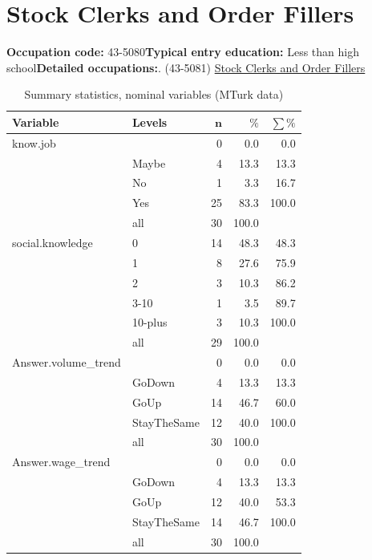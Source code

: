 \documentclass[a4paper,10pt]{article}\usepackage[]{graphicx}\usepackage[]{color}
\begin{document}
\newpage\section{Stock Clerks and Order Fillers}\textbf{Occupation code:} 43-5080\newline\textbf{Typical entry education:} Less than high school\newline\textbf{Detailed occupations:}. (43-5081)  \href{http://www.bls.gov/oes/current/oes435081.htm}{Stock Clerks and Order Fillers}\newline%
\begin{table}[ht]
\centering
{\footnotesize
\begin{tabular}{ll|rrr}
 \textbf{Variable} & \textbf{Levels} & $\mathbf{n}$ & $\mathbf{\%}$ & $\mathbf{\sum \%}$ \\ 
  \hline
know.job &  & 0 & 0.0 & 0.0 \\ 
   & Maybe & 4 & 13.3 & 13.3 \\ 
   & No & 1 & 3.3 & 16.7 \\ 
   & Yes & 25 & 83.3 & 100.0 \\ 
   \hline
 & all & 30 & 100.0 &  \\ 
   \hline
\hline
social.knowledge & 0 & 14 & 48.3 & 48.3 \\ 
   & 1 & 8 & 27.6 & 75.9 \\ 
   & 2 & 3 & 10.3 & 86.2 \\ 
   & 3-10 & 1 & 3.5 & 89.7 \\ 
   & 10-plus & 3 & 10.3 & 100.0 \\ 
   \hline
 & all & 29 & 100.0 &  \\ 
   \hline
\hline
Answer.volume\_trend &  & 0 & 0.0 & 0.0 \\ 
   & GoDown & 4 & 13.3 & 13.3 \\ 
   & GoUp & 14 & 46.7 & 60.0 \\ 
   & StayTheSame & 12 & 40.0 & 100.0 \\ 
   \hline
 & all & 30 & 100.0 &  \\ 
   \hline
\hline
Answer.wage\_trend &  & 0 & 0.0 & 0.0 \\ 
   & GoDown & 4 & 13.3 & 13.3 \\ 
   & GoUp & 12 & 40.0 & 53.3 \\ 
   & StayTheSame & 14 & 46.7 & 100.0 \\ 
   \hline
 & all & 30 & 100.0 &  \\ 
   \hline
\hline
\end{tabular}
}
\caption{Summary statistics, nominal variables (MTurk data)} 
\label{tab1:43-5080}
\end{table}
\end{document}
